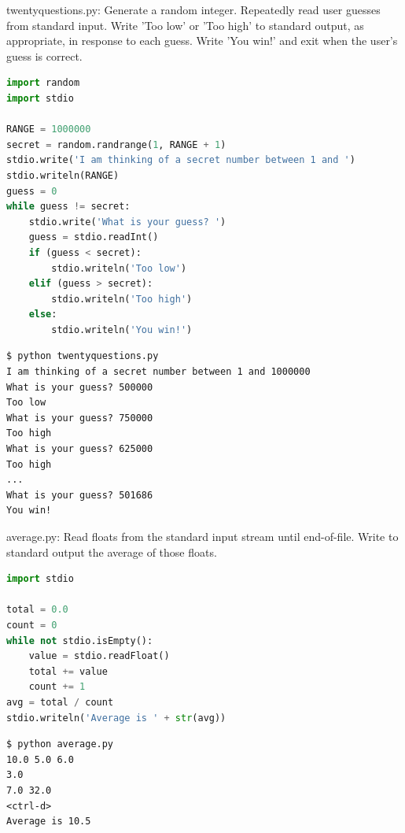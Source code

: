\documentclass[8pt,a4paper,compress,handout]{beamer}
\begin{document}
\begin{frame}[fragile]
\begin{framed}
\tiny twentyquestions.py: Generate a random integer. Repeatedly read user guesses from standard input. Write 'Too low' or 'Too high' to standard output, as appropriate, in response to each guess. Write 'You win!' and exit when the user's guess is correct.
\end{framed}

\begin{lstlisting}[language=Python]
import random
import stdio

RANGE = 1000000
secret = random.randrange(1, RANGE + 1)
stdio.write('I am thinking of a secret number between 1 and ')
stdio.writeln(RANGE)
guess = 0
while guess != secret:
    stdio.write('What is your guess? ')
    guess = stdio.readInt()
    if (guess < secret):
        stdio.writeln('Too low')
    elif (guess > secret):
        stdio.writeln('Too high')
    else:
        stdio.writeln('You win!')
\end{lstlisting}

\begin{lstlisting}[language={}]
$ python twentyquestions.py
I am thinking of a secret number between 1 and 1000000
What is your guess? 500000
Too low
What is your guess? 750000     
Too high
What is your guess? 625000
Too high
...
What is your guess? 501686
You win!
\end{lstlisting}

\end{frame}

\begin{frame}[fragile]
\begin{framed}
\tiny average.py: Read floats from the standard input stream until end-of-file. Write to standard output the average of those floats.
\end{framed}

\begin{lstlisting}[language=Python]
import stdio

total = 0.0
count = 0
while not stdio.isEmpty():
    value = stdio.readFloat()
    total += value
    count += 1
avg = total / count
stdio.writeln('Average is ' + str(avg))
\end{lstlisting}

\begin{lstlisting}[language={}]
$ python average.py
10.0 5.0 6.0
3.0
7.0 32.0
<ctrl-d>
Average is 10.5
\end{lstlisting}
\end{frame}
\end{document}
